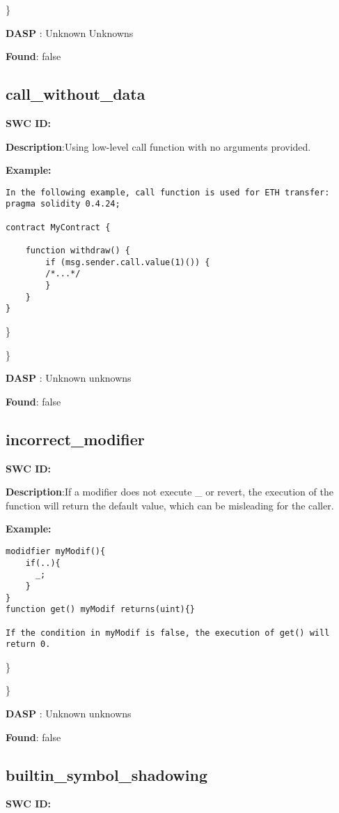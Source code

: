 \documentclass{article}
\begin{document}
\} 

\textbf{DASP} : Unknown Unknowns

\textbf{Found}: false

\subsection{call\_without\_data} 
\textbf{SWC \textunderscore ID:} 

\textbf{Description}:Using low-level call function with no arguments provided.


\textbf{Example:} 
\begin{verbatim}
In the following example, call function is used for ETH transfer:
pragma solidity 0.4.24;

contract MyContract {

    function withdraw() {
        if (msg.sender.call.value(1)()) {
        /*...*/
        }
    }
}

\end{verbatim}\} 

\} 

\textbf{DASP} : Unknown unknowns

\textbf{Found}: false

\subsection{incorrect\_modifier} 
\textbf{SWC \textunderscore ID:} 

\textbf{Description}:If a modifier does not execute _ or revert, the execution of the function will return the default value, which can be misleading for the caller.


\textbf{Example:} 
\begin{verbatim}
modidfier myModif(){
    if(..){
      _;
    }
}
function get() myModif returns(uint){}

If the condition in myModif is false, the execution of get() will return 0.

\end{verbatim}\} 

\} 

\textbf{DASP} : Unknown unknowns

\textbf{Found}: false

\subsection{builtin\_symbol\_shadowing} 
\textbf{SWC \textunderscore ID:} 
\end{document}
